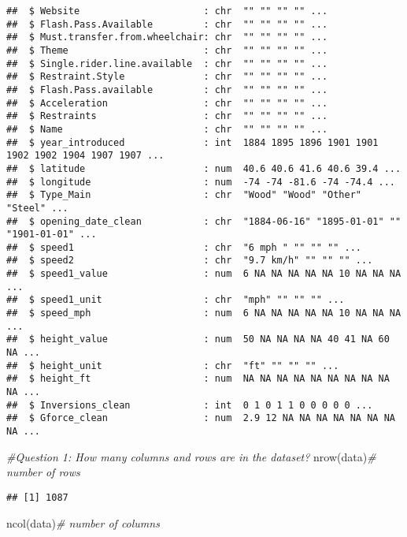 \documentclass[
]{article}
\newenvironment{Shaded}{\begin{snugshade}}{\end{snugshade}}
\newcommand{\CommentTok}[1]{\textcolor[rgb]{0.56,0.35,0.01}{\textit{#1}}}
\newcommand{\FunctionTok}[1]{\textcolor[rgb]{0.00,0.00,0.00}{#1}}
\newcommand{\NormalTok}[1]{#1}
\begin{document}
\begin{verbatim}
##  $ Website                      : chr  "" "" "" "" ...
##  $ Flash.Pass.Available         : chr  "" "" "" "" ...
##  $ Must.transfer.from.wheelchair: chr  "" "" "" "" ...
##  $ Theme                        : chr  "" "" "" "" ...
##  $ Single.rider.line.available  : chr  "" "" "" "" ...
##  $ Restraint.Style              : chr  "" "" "" "" ...
##  $ Flash.Pass.available         : chr  "" "" "" "" ...
##  $ Acceleration                 : chr  "" "" "" "" ...
##  $ Restraints                   : chr  "" "" "" "" ...
##  $ Name                         : chr  "" "" "" "" ...
##  $ year_introduced              : int  1884 1895 1896 1901 1901 1902 1902 1904 1907 1907 ...
##  $ latitude                     : num  40.6 40.6 41.6 40.6 39.4 ...
##  $ longitude                    : num  -74 -74 -81.6 -74 -74.4 ...
##  $ Type_Main                    : chr  "Wood" "Wood" "Other" "Steel" ...
##  $ opening_date_clean           : chr  "1884-06-16" "1895-01-01" "" "1901-01-01" ...
##  $ speed1                       : chr  "6 mph " "" "" "" ...
##  $ speed2                       : chr  "9.7 km/h" "" "" "" ...
##  $ speed1_value                 : num  6 NA NA NA NA NA 10 NA NA NA ...
##  $ speed1_unit                  : chr  "mph" "" "" "" ...
##  $ speed_mph                    : num  6 NA NA NA NA NA 10 NA NA NA ...
##  $ height_value                 : num  50 NA NA NA NA 40 41 NA 60 NA ...
##  $ height_unit                  : chr  "ft" "" "" "" ...
##  $ height_ft                    : num  NA NA NA NA NA NA NA NA NA NA ...
##  $ Inversions_clean             : int  0 1 0 1 1 0 0 0 0 0 ...
##  $ Gforce_clean                 : num  2.9 12 NA NA NA NA NA NA NA NA ...
\end{verbatim}

\begin{Shaded}
\begin{Highlighting}[]
\CommentTok{\#Question 1: How many columns and rows are in the dataset?}
\FunctionTok{nrow}\NormalTok{(data)}\CommentTok{\# number of rows }
\end{Highlighting}
\end{Shaded}

\begin{verbatim}
## [1] 1087
\end{verbatim}

\begin{Shaded}
\begin{Highlighting}[]
\FunctionTok{ncol}\NormalTok{(data)}\CommentTok{\# number of columns }
\end{Highlighting}
\end{Shaded}
\end{document}
